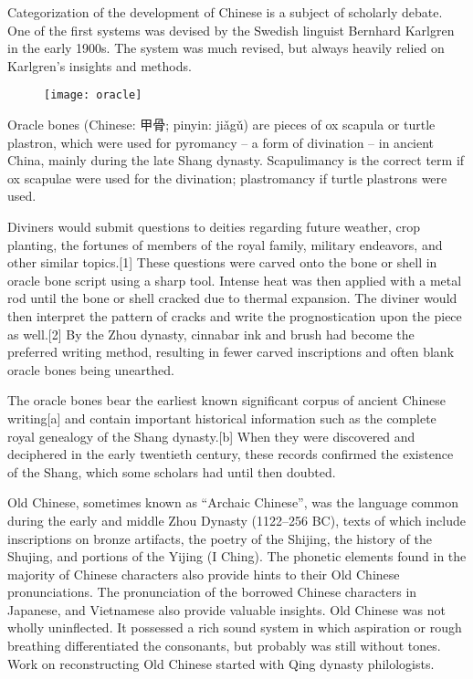 Categorization of the development of Chinese is a subject of scholarly debate. One of the first systems was devised by the Swedish linguist Bernhard Karlgren in the early 1900s. The system was much revised, but always heavily relied on Karlgren's insights and methods.

\begin{figure}[htbp]
\centering

\texttt{[image: oracle]}

\end{figure}

Oracle bones (Chinese: {\cjk 甲骨}; pinyin: {\cjk jiǎgǔ}) are pieces of ox scapula or turtle plastron, which were used for pyromancy – a form of divination – in ancient China, mainly during the late Shang dynasty. Scapulimancy is the correct term if ox scapulae were used for the divination; plastromancy if turtle plastrons were used.

Diviners would submit questions to deities regarding future weather, crop planting, the fortunes of members of the royal family, military endeavors, and other similar topics.[1] These questions were carved onto the bone or shell in oracle bone script using a sharp tool. Intense heat was then applied with a metal rod until the bone or shell cracked due to thermal expansion. The diviner would then interpret the pattern of cracks and write the prognostication upon the piece as well.[2] By the Zhou dynasty, cinnabar ink and brush had become the preferred writing method, resulting in fewer carved inscriptions and often blank oracle bones being unearthed.

The oracle bones bear the earliest known significant corpus of ancient Chinese writing[a] and contain important historical information such as the complete royal genealogy of the Shang dynasty.[b] When they were discovered and deciphered in the early twentieth century, these records confirmed the existence of the Shang, which some scholars had until then doubted.

Old Chinese, sometimes known as ``Archaic Chinese'', was the language common during the early and middle Zhou Dynasty (1122–256 BC), texts of which include inscriptions on bronze artifacts, the poetry of the Shijing, the history of the Shujing, and portions of the Yijing (I Ching). The phonetic elements found in the majority of Chinese characters also provide hints to their Old Chinese pronunciations. The pronunciation of the borrowed Chinese characters in Japanese, and Vietnamese also provide valuable insights. Old Chinese was not wholly uninflected. It possessed a rich sound system in which aspiration or rough breathing differentiated the consonants, but probably was still without tones. Work on reconstructing Old Chinese started with Qing dynasty philologists.

